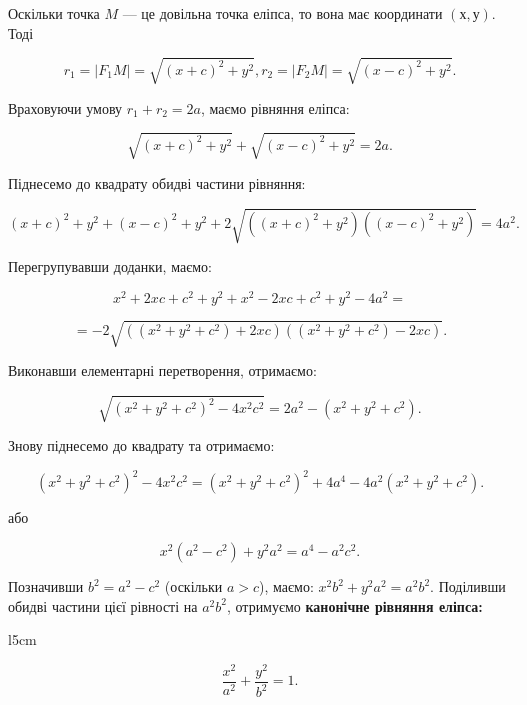 Оскільки точка $M$ --- це довільна точка еліпса, то вона має координати $(х,у)$. Тоді

$$r_1 = |F_1M| = \sqrt{(x+c)^2+y^2}, r_2 = |F_2M| = \sqrt{(x-c)^2+y^2}.$$

Враховуючи умову $r_1 + r_2 = 2a$, маємо рівняння еліпса:

$$\sqrt{(x+c)^2+y^2} + \sqrt{(x-c)^2+y^2} = 2a.$$

Піднесемо до квадрату обидві частини рівняння:

$$(x+c)^2+y^2 + (x-c)^2+y^2 + 2\sqrt{((x+c)^2+y^2)((x-c)^2+y^2)} = 4a^2.$$

Перегрупувавши доданки, маємо:

$$x^2 + 2xc + c^2 + y^2 + x^2 - 2xc + c^2 + y^2 - 4a^2 = $$

$$= -2\sqrt{((x^2 + y^2 + c^2) + 2xc)((x^2 + y^2 + c^2) - 2xc)}.$$

Виконавши елементарні перетворення, отримаємо: 

$$\sqrt{(x^2 + y^2 + c^2)^2 - 4x^2c^2} = 2a^2 - (x^2 + y^2 + c^2).$$

Знову піднесемо до квадрату та отримаємо:

$$(x^2 + y^2 + c^2)^2 - 4x^2c^2 = (x^2 + y^2 + c^2)^2 + 4a^4 - 4a^2(x^2 + y^2 + c^2).$$

\begin{center}
	або
\end{center}	
	
$$x^2(a^2 - c^2) + y^2a^2 = a^4 - a^2c^2.$$

Позначивши $b^2 = a^2 - c^2$ (оскільки $a>c$), маємо: $x^2b^2 + y^2a^2 = a^2b^2$.
Поділивши обидві частини цієї рівності на $a^2b^2$, отримуємо \textbf{канонічне рівняння
еліпса:}

\begin{wrapfigure}{l}{5cm}\end{wrapfigure}

$$\dfrac{x^2}{a^2} + \dfrac{y^2}{b^2} = 1.$$

